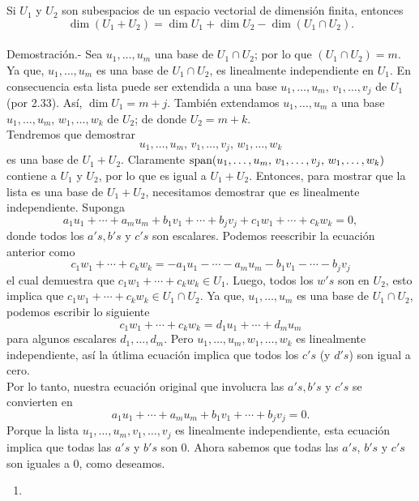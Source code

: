 \begin{myteo}\,\\\\
    Si $U_1$ y $U_2$ son subespacios de un espacio vectorial de dimensión finita, entonces
    $$\dim(U_1+U_2)=\dim U_1+\dim U_2 - \dim(U_1\cap U_2).$$\\
	Demostración.-\; Sea $u_1,\ldots,u_m$ una base de $U_1\cap U_2$; por lo que $(U_1\cap U_2)=m$. Ya que, $u_1,\ldots,u_m$ es una base de $U_1\cap U_2$, es linealmente independiente en $U_1$. En consecuencia esta lista puede ser extendida a una base $u_1,\ldots,u_m,\, v_1,\ldots,v_j$ de $U_1$ (por 2.33). Así, $\dim U_1=m+j$. También extendamos $u_1,\ldots,u_m$ a una base $u_1,\ldots,u_m,\, w_1,\ldots,w_k$ de $U_2$; de donde $U_2=m+k$.\\
	Tendremos que demostrar
	$$u_1,\ldots,u_m,\, v_1,\ldots,v_j,\,w_1,\ldots,w_k$$
	es una base de $U_1+U_2$. Claramente $\mathop{\mbox{\normalfont span}}\nolimits(u_1,\ldots,u_m,\, v_1,\ldots,v_j,\,w_1,\ldots,w_k)$ contiene a $U_1$ y $U_2$, por lo que es igual a $U_1+U_2$. Entonces, para mostrar que la lista es una base de $U_1+U_2$, necesitamos demostrar que es linealmente independiente. Suponga
	$$a_1u_1+\cdots+a_mu_m+b_1v_1+\cdots+b_jv_j+c_1w_1+\cdots+c_kw_k=0,$$
	donde todos los $a's,b's$ y $c's$ son escalares. Podemos reescribir la ecuación anterior como
	$$c_1w_1+\cdots+c_kw_k=-a_1u_1-\cdots-a_mu_m-b_1v_1-\cdots-b_jv_j$$
	el cual demuestra que $c_1w_1+\cdots+c_kw_k\in U_1$. Luego, todos los $w's$ son en $U_2$, esto implica que $c_1w_1+\cdots+c_kw_k\in U_1\cap U_2$. Ya que, $u_1,\ldots,u_m$ es una base de $U_1\cap U_2$, podemos escribir lo siguiente
	$$c_1w_1+\cdots+c_kw_k=d_1u_1+\cdots+d_m u_m$$
	para algunos escalares $d_1,\ldots,d_m$. Pero $u_1,\ldots,u_m,w_1,\ldots,w_k$ es linealmente independiente, así la útlima ecuación implica que todos los $c's$ (y $d's$) son igual a cero. \\
	
	Por lo tanto, nuestra ecuación original que involucra las $a's, b's$ y $c's$ se convierten en 
	$$a_1u_1+\cdots+a_mu_m+b_1v_1+\cdots+b_jv_j=0.$$
	Porque la lista $u_1,\ldots, u_m, v_1, \ldots, v_j$ es linealmente independiente, esta ecuación implica que todas las $a's$ y $b's$ son $0$. Ahora sabemos que todas las $a's$, $b's$ y $c's$ son iguales a $0$, como deseamos.
\end{myteo}
\vspace{.5cm}

\setcounter{mysection}{2}

\begin{enumerate}[\bfseries 1.]

    \item 

\end{enumerate}
